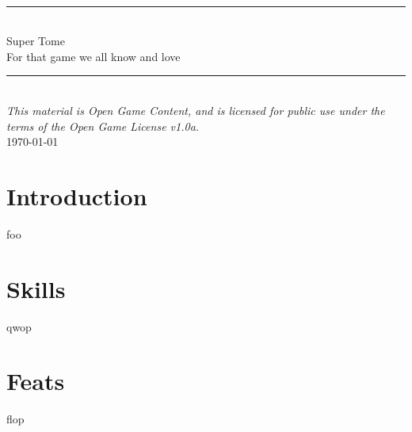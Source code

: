 \documentclass[12pt,twoside,onecolumn,openany,final]{memoir}
\begin{document}
\thispagestyle{empty}
\begin{center}
\textsc{\Large}\\[0.25cm]
\rule{\linewidth}{0.5mm} \\[0.70cm]
\fontsize{30}{30} \selectfont Super Tome\\[.30cm]
\fontsize{16}{18} \selectfont \guillemotleft{} For that game we all know and love \guillemotright{}\\
\rule{\linewidth}{0.5mm} \\[0.6cm]
\vfill
\footnotesize{\textit{This material is Open Game Content, and is licensed for public use under the terms of the Open Game License v1.0a.}}\\
\normalsize{\today}
\end{center}

\pagebreak
\sffamily
\pagestyle{plain}
\raggedbottom

\renewcommand{\contentsname}{Table of Contents}
\setcounter{tocdepth}{1}
\tableofcontents



\clearpage
\chapter{Introduction}
foo




\chapter{Skills}
qwop
\chapter{Feats}
flop
\end{document}
